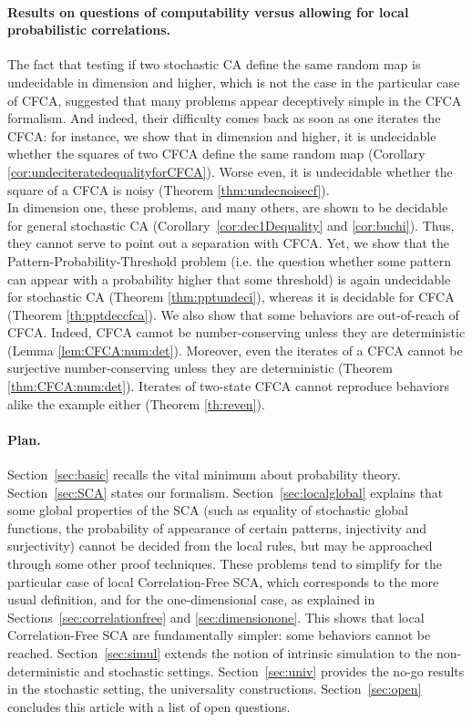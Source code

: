 \documentclass[submission]{fundam}
\begin{document}
\paragraph{Results on questions of computability versus allowing for local probabilistic correlations.} 
The fact that testing if two stochastic CA define the same random map is undecidable in dimension  and higher, which is not the case in the particular case of CFCA, suggested that many problems appear deceptively simple in the CFCA formalism. And indeed, their difficulty comes back as soon as one iterates the CFCA: for instance, we show that in dimension  and higher, it is undecidable whether the squares of two CFCA define the same random map (Corollary \ref{cor:undeciteratedequalityforCFCA}). Worse even, it is undecidable whether the square of a CFCA is noisy (Theorem \ref{thm:undecnoisecf}). \\
In dimension one, these problems, and many others, are shown to be decidable for general stochastic CA (Corollary~\ref{cor:dec1Dequality} and \ref{cor:buchi}). Thus, they cannot serve to point out a separation with CFCA. Yet, we show that the Pattern-Probability-Threshold problem (i.e. the question whether some pattern can appear with a probability higher that some threshold) is again undecidable for stochastic CA (Theorem \ref{thm:pptundeci}), whereas it is decidable for CFCA (Theorem \ref{th:pptdeccfca}). We also show that some behaviors are out-of-reach of CFCA. Indeed, CFCA cannot be number-conserving unless they are deterministic (Lemma \ref{lem:CFCA:num:det}). Moreover, even the iterates of a CFCA cannot be surjective number-conserving unless they are deterministic (Theorem \ref{thm:CFCA:num:det}). Iterates of two-state CFCA cannot reproduce behaviors alike the  example either (Theorem \ref{th:reven}). 


\paragraph{Plan.} Section~\ref{sec:basic} recalls the vital minimum about probability theory. Section~\ref{sec:SCA} states our formalism. Section~\ref{sec:localglobal} explains that some global properties of the SCA (such as equality of stochastic global functions, the probability of appearance of certain patterns, injectivity and surjectivity) cannot be decided from the local rules, but may be approached through some other proof techniques. These problems tend to simplify for the particular case of local Correlation-Free SCA, which corresponds to the more usual definition, and for the one-dimensional case, as explained in Sections~\ref{sec:correlationfree} and \ref{sec:dimensionone}. This shows that local Correlation-Free SCA are fundamentally simpler: some behaviors cannot be reached. Section~\ref{sec:simul} extends the notion of  intrinsic simulation to the non-deterministic and stochastic settings.  Section~\ref{sec:univ} provides the no-go results in the stochastic setting, the universality constructions. Section~\ref{sec:open} concludes this article with a list of open questions. 
\end{document}
